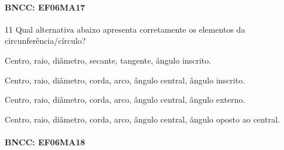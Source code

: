 {\paragraph{BNCC: EF06MA17 }


\num{11} Qual alternativa abaixo apresenta corretamente os elementos da
circunferência/círculo?

\begin{escolha}
\item Centro, raio, diâmetro, secante, tangente, ângulo inscrito.
\item Centro, raio, diâmetro, corda, arco, ângulo central, ângulo inscrito.
\item Centro, raio, diâmetro, corda, arco, ângulo central, ângulo externo.
\item Centro, raio, diâmetro, corda, arco, ângulo central, ângulo oposto ao
central.
\end{escolha}

\paragraph{BNCC: EF06MA18 }


}
